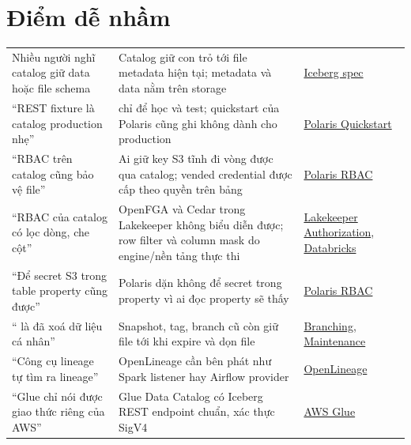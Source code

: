 \section{Điểm dễ nhầm}
\begin{xltabular}{\textwidth}{@{}P{4.2cm} L P{3.2cm}@{}}
\toprule
{} &  &  \\
\midrule
\endhead
\bottomrule
\endfoot
Nhiều người nghĩ catalog giữ data hoặc file schema & Catalog giữ con trỏ tới file metadata hiện tại; metadata và data nằm trên storage & \href{https://iceberg.apache.org/spec/}{Iceberg spec} \\
``REST fixture là catalog production nhẹ'' &  chỉ để học và test; quickstart của Polaris cũng ghi không dành cho production & \href{https://polaris.apache.org/guides/quickstart/}{Polaris Quickstart} \\
``RBAC trên catalog cũng bảo vệ file'' & Ai giữ key S3 tĩnh đi vòng được qua catalog; vended credential được cấp theo quyền trên bảng & \href{https://polaris.apache.org/in-dev/unreleased/managing-security/access-control/}{Polaris RBAC} \\
``RBAC của catalog có lọc dòng, che cột'' & OpenFGA và Cedar trong Lakekeeper không biểu diễn được; row filter và column mask do engine/nền tảng thực thi & \href{https://docs.lakekeeper.io/docs/nightly/authorization/}{Lakekeeper Authorization}, \href{https://docs.databricks.com/aws/en/data-governance/unity-catalog/filters-and-masks/}{Databricks} \\
``Để secret S3 trong table property cũng được'' & Polaris dặn không để secret trong property vì ai đọc property sẽ thấy & \href{https://polaris.apache.org/in-dev/unreleased/managing-security/access-control/}{Polaris RBAC} \\
`` là đã xoá dữ liệu cá nhân'' & Snapshot, tag, branch cũ còn giữ file tới khi expire và dọn file & \href{https://iceberg.apache.org/docs/latest/branching/}{Branching}, \href{https://iceberg.apache.org/docs/latest/maintenance/}{Maintenance} \\
``Công cụ lineage tự tìm ra lineage'' & OpenLineage cần bên phát như Spark listener hay Airflow provider & \href{https://openlineage.io/getting-started/}{OpenLineage} \\
``Glue chỉ nói được giao thức riêng của AWS'' & Glue Data Catalog có Iceberg REST endpoint chuẩn, xác thực SigV4 & \href{https://docs.aws.amazon.com/glue/latest/dg/connect-glu-iceberg-rest.html}{AWS Glue} \\
\end{xltabular}
